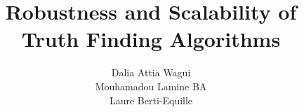 \documentclass{vldb}
\begin{document}
\title{Robustness and Scalability of Truth Finding Algorithms}
\author{
\alignauthor
Dalia Attia Wagui\\
\alignauthor
Mouhamadou Lamine BA\\
\alignauthor 
Laure Berti-Equille\\
}%
\maketitle
\end{document}
